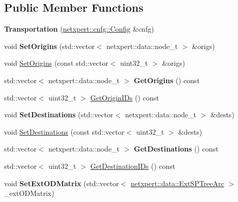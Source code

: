 \subsection*{Public Member Functions}
\begin{DoxyCompactItemize}
\item 
{\bfseries Transportation} (\hyperlink{structnetxpert_1_1cnfg_1_1Config}{netxpert\+::cnfg\+::\+Config} \&cnfg)\hypertarget{classnetxpert_1_1Transportation_ae6be3241f69bab69b2a1059178ae9fe5}{}\label{classnetxpert_1_1Transportation_ae6be3241f69bab69b2a1059178ae9fe5}

\item 
void {\bfseries Set\+Origins} (std\+::vector$<$ netxpert\+::data\+::node\+\_\+t $>$ \&origs)\hypertarget{classnetxpert_1_1Transportation_a89c684ee01d1ec1e3e02342cdc761837}{}\label{classnetxpert_1_1Transportation_a89c684ee01d1ec1e3e02342cdc761837}

\item 
void \hyperlink{classnetxpert_1_1Transportation_af603fe6fe78c175e90c002cec25c4f04}{Set\+Origins} (const std\+::vector$<$ uint32\+\_\+t $>$ \&origs)
\item 
std\+::vector$<$ netxpert\+::data\+::node\+\_\+t $>$ {\bfseries Get\+Origins} () const \hypertarget{classnetxpert_1_1Transportation_a5a6a99c1757a99e4dfa3fc1cd6f68f4f}{}\label{classnetxpert_1_1Transportation_a5a6a99c1757a99e4dfa3fc1cd6f68f4f}

\item 
std\+::vector$<$ uint32\+\_\+t $>$ \hyperlink{classnetxpert_1_1Transportation_afa07a6327889540be7db46ade38160f4}{Get\+Origin\+I\+Ds} () const 
\item 
void {\bfseries Set\+Destinations} (std\+::vector$<$ netxpert\+::data\+::node\+\_\+t $>$ \&dests)\hypertarget{classnetxpert_1_1Transportation_a8bfe70ee838457b6f25eb77de12c9ff2}{}\label{classnetxpert_1_1Transportation_a8bfe70ee838457b6f25eb77de12c9ff2}

\item 
void \hyperlink{classnetxpert_1_1Transportation_ac57b4230b6b295940fd673baa3b58c16}{Set\+Destinations} (const std\+::vector$<$ uint32\+\_\+t $>$ \&dests)
\item 
std\+::vector$<$ netxpert\+::data\+::node\+\_\+t $>$ {\bfseries Get\+Destinations} () const \hypertarget{classnetxpert_1_1Transportation_a9cb96d2c88207ef4599088f6562300dc}{}\label{classnetxpert_1_1Transportation_a9cb96d2c88207ef4599088f6562300dc}

\item 
std\+::vector$<$ uint32\+\_\+t $>$ \hyperlink{classnetxpert_1_1Transportation_ae901ff6721689f44d65373e79bc169b2}{Get\+Destination\+I\+Ds} () const 
\item 
void {\bfseries Set\+Ext\+O\+D\+Matrix} (std\+::vector$<$ \hyperlink{structnetxpert_1_1data_1_1ExtSPTreeArc}{netxpert\+::data\+::\+Ext\+S\+P\+Tree\+Arc} $>$ \+\_\+ext\+O\+D\+Matrix)\hypertarget{classnetxpert_1_1Transportation_aa3f6586670404e4c156afcd7ea1f6b3e}{}\label{classnetxpert_1_1Transportation_aa3f6586670404e4c156afcd7ea1f6b3e}


\end{DoxyCompactItemize}
